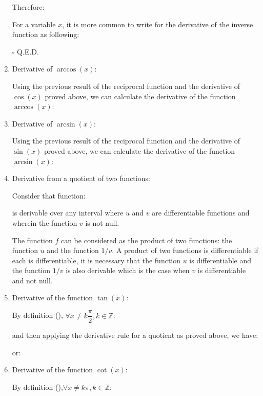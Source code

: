 \begin{enumerate}
\begin{dem}
		 	Therefore:
		 	
		 	For a variable $x$, it is more common to write for the derivative of the inverse function as following:
		 	
		 	\begin{flushright}
			$\square$  Q.E.D.
			\end{flushright}
		 \end{dem}
		 \item Derivative of $\arccos (x)$:
		 
		 	Using the previous result of the reciprocal function and the derivative of $\cos (x)$ proved above, we can calculate the derivative of the function $\arccos (x)$:
		 	
		 	\item Derivative of $\arcsin (x)$:
		 
		 	Using the previous result of the reciprocal function and the derivative of $\sin (x)$ proved above, we can calculate the derivative of the function $\arcsin (x)$:
		 	
		 	\item Derivative from a quotient of two functions:
		 	
		 	Consider that function:
		 	
		 	is derivable over any interval where $u$ and $v$ are differentiable functions and wherein the function $v$ is not null.
		 	
		 	The function $f$ can be considered as the product of two functions: the function $u$ and the function $1/v$. A product of two functions is differentiable if each is differentiable, it is necessary that the function $u$ is differentiable and the function $1/v$ is also derivable which is the case when $v$ is differentiable and not null.
		 	
		 	\item Derivative of the function $\tan(x)$:
		 	
		 	By definition (), $\forall x \neq k\dfrac{\pi}{2},k\in \mathbb{Z}$:
		 	
		 	and then applying the derivative rule for a quotient as proved above, we have:
		 	
		 	or:
		 	
		 	\item Derivative of the function $\cot(x)$:
		 	
		 	By definition (),$\forall x \neq k\pi,k\in \mathbb{Z}$:
		 	

\end{enumerate}
